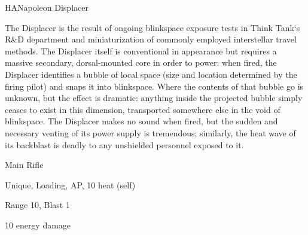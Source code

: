 \begin{mech}{HA}{Napoleon}
Displacer

The Displacer is the result of ongoing blinkspace exposure tests in Think Tank‘s R\&D department and miniaturization of commonly employed interstellar travel methods. The Displacer itself is conventional in appearance but requires a massive secondary, dorsal-mounted core in order to power: when fired, the Displacer identifies a bubble of local space (size and location determined by the firing pilot) and snaps it into blinkspace. Where the contents of that bubble go is unknown, but the effect is dramatic: anything inside the projected bubble simply ceases to exist in this dimension, transported somewhere else in the void of blinkspace. The Displacer makes no sound when fired, but the sudden and necessary venting of its power supply is tremendous; similarly, the heat wave of its backblast is deadly to any unshielded personnel exposed to it.

Main Rifle

Unique, Loading, AP, 10 heat (self)

Range 10, Blast 1

10 energy damage
\end{mech}